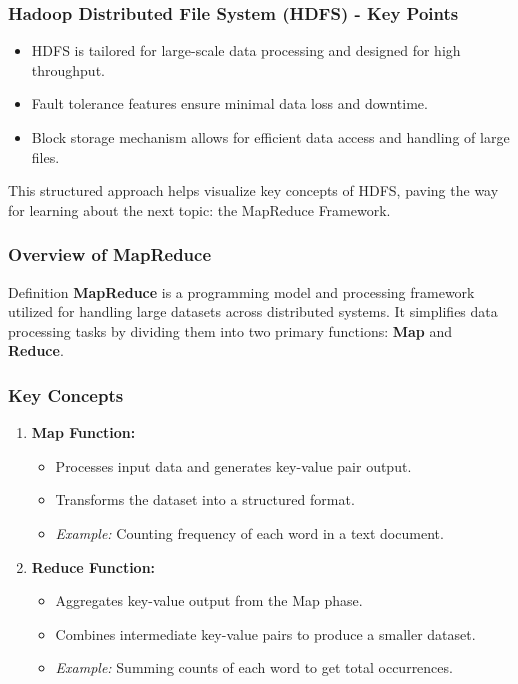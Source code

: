 \documentclass[aspectratio=169]{beamer}
\begin{document}
\begin{frame}[fragile]
    \frametitle{Hadoop Distributed File System (HDFS) - Key Points}
    \begin{itemize}
        \item HDFS is tailored for large-scale data processing and designed for high throughput.
        \item Fault tolerance features ensure minimal data loss and downtime.
        \item Block storage mechanism allows for efficient data access and handling of large files.
    \end{itemize}
    This structured approach helps visualize key concepts of HDFS, paving the way for learning about the next topic: the MapReduce Framework.
\end{frame}

\begin{frame}[fragile]
    \frametitle{Overview of MapReduce}
    \begin{block}{Definition}
        \textbf{MapReduce} is a programming model and processing framework utilized for handling large datasets across distributed systems. It simplifies data processing tasks by dividing them into two primary functions: \textbf{Map} and \textbf{Reduce}.
    \end{block}
\end{frame}

\begin{frame}[fragile]
    \frametitle{Key Concepts}
    \begin{enumerate}
        \item \textbf{Map Function:}
        \begin{itemize}
            \item Processes input data and generates key-value pair output. 
            \item Transforms the dataset into a structured format.
            \item \textit{Example:} Counting frequency of each word in a text document.
        \end{itemize}
        \item \textbf{Reduce Function:}
        \begin{itemize}
            \item Aggregates key-value output from the Map phase.
            \item Combines intermediate key-value pairs to produce a smaller dataset.
            \item \textit{Example:} Summing counts of each word to get total occurrences.
        \end{itemize}
    \end{enumerate}
\end{frame}
\end{document}
